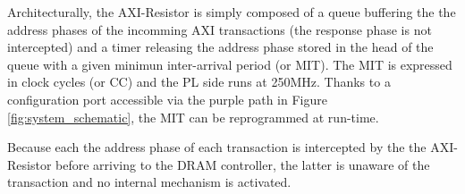         Architecturally, the AXI-Resistor is simply composed of a queue buffering the the address phases of the incomming AXI transactions \cite{ARM-AXI} (the response phase is not intercepted) and a timer releasing the address phase stored in the head of the queue with a given minimun inter-arrival period (or MIT). The MIT is expressed in clock cycles (or CC) and the PL side runs at 250MHz. Thanks to a configuration port accessible via the purple path in Figure \ref{fig:system_schematic}, the MIT can be reprogrammed at run-time.

        Because each the address phase of each transaction is intercepted by the the AXI-Resistor before arriving to the DRAM controller, the latter is unaware of the transaction and no internal mechanism is activated.
